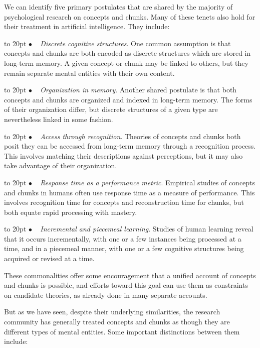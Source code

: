 \documentclass[11pt,letterpaper]{article}
\def\texitem#1{\par\noindent\hangindent 20pt
               \hbox to 20pt {\hss #1 ~}\ignorespaces}
\def\bull{\texitem{$\bullet$}}
\begin{document}

We can identify five primary postulates that are shared by the majority
of psychological research on concepts and chunks. Many of these tenets
also hold for their treatment in artificial intelligence. They include:

\vskip 0.05in

\bull
{\it Discrete cognitive structures\/}. 
One common assumption is that concepts and chunks are both encoded
as discrete structures which are stored in long-term memory. A 
given concept or chunk may be linked to others, but they remain
separate mental entities with their own content. 

\bull
{\it Organization in memory\/}. 
Another shared postulate is that both concepts and chunks are
organized and indexed in long-term memory. The forms of their 
organization differ, but discrete structures of a given type
are nevertheless linked in some fashion. 

\bull
{\it Access through recognition\/}. 
Theories of concepts and chunks both posit they can be accessed
from long-term memory through a recognition process. This involves 
matching their descriptions against perceptions, but it may also 
take advantage of their organization. 

\bull
{\it Response time as a performance metric\/}. 
Empirical studies of concepts and chunks in humans often use
response time as a measure of performance. This involves
recognition time for concepts and reconstruction time for chunks,
but both equate rapid processing with mastery. 

\bull
{\it Incremental and piecemeal learning\/}. 
Studies of human learning reveal that it occurs incrementally, with 
one or a few instances being processed at a time, and in a piecemeal 
manner, with one or a few cognitive structures being acquired or 
revised at a time. 


\vskip 0.05in
\noindent
These commonalities offer some encouragement that a unified account
of concepts and chunks is possible, and efforts toward this goal can 
use them as constraints on candidate theories, as already done in
many separate accounts. 


But as we have seen, despite their underlying similarities, the
research community has generally treated concepts and chunks as 
though they are different types of mental entities. Some important
distinctions between them include: 
\end{document}
